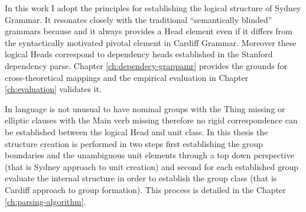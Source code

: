 


In this work I adopt the principles for establishing the logical structure of Sydney Grammar. It resonates closely with the traditional ``semantically blinded'' grammars because and it always provides a Head element even if it differs from the syntactically motivated pivotal element in Cardiff Grammar. Moreover these logical Heads correspond to dependency heads established in the Stanford dependency parse. Chapter \ref{ch:dependecy-grappamr} provides the grounds for cross-theoretical mappings and the empirical evaluation in Chapter \ref{ch:evaluation} validates it.

In language is not unusual to have nominal groups with the Thing missing or elliptic clauses with the Main verb missing therefore no rigid correspondence can be established between the logical Head and unit class. 
In this thesis the structure creation is performed in two steps first establishing the group boundaries and the unambiguous unit elements through a top down perspective (that is Sydney approach to unit creation) and second for each established group evaluate the internal structure in order to establish the group class (that is Cardiff approach to group formation). This process is detailed in the Chapter \ref{ch:parsing-algorithm}.

